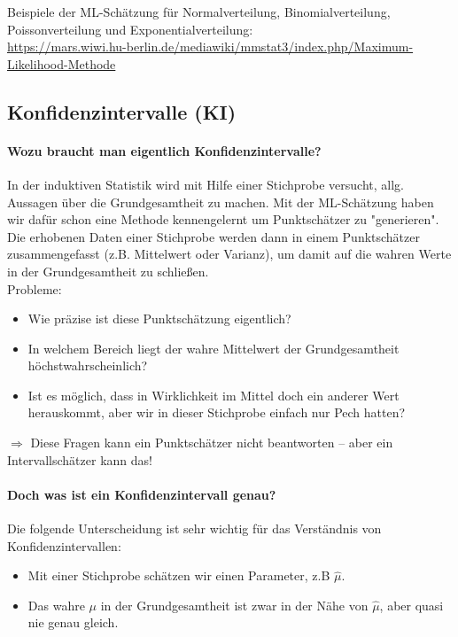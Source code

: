 \documentclass[a4paper]{article}
\newcommand\dangersign[1][2ex]{%
  \renewcommand\stacktype{L}%
  \scaleto{\stackon[1.3pt]{\color{red}$\triangle$}{\tiny !}}{#1}%
}
\begin{document}
\noindent Beispiele der ML-Schätzung für Normalverteilung, Binomialverteilung, Poissonverteilung und Exponentialverteilung:\\
\url{https://mars.wiwi.hu-berlin.de/mediawiki/mmstat3/index.php/Maximum-Likelihood-Methode}

\clearpage

\subsection{Konfidenzintervalle (KI)}\label{sec:KI}

\paragraph{Wozu braucht man eigentlich Konfidenzintervalle?} In der induktiven Statistik wird mit Hilfe einer Stichprobe versucht, allg. Aussagen über die Grundgesamtheit zu machen. Mit der ML-Schätzung haben wir dafür schon eine Methode kennengelernt um Punktschätzer zu "generieren". Die erhobenen Daten einer Stichprobe werden dann in einem Punktschätzer zusammengefasst (z.B. Mittelwert oder Varianz), um damit auf die wahren Werte in der Grundgesamtheit zu schließen.\\

\noindent \dangersign[3ex] Probleme:

\begin{itemize}
    \item Wie präzise ist diese Punktschätzung eigentlich?
    \item In welchem Bereich liegt der wahre Mittelwert der Grundgesamtheit höchstwahrscheinlich?
    \item Ist es möglich, dass in Wirklichkeit im Mittel doch ein anderer Wert herauskommt, aber wir in dieser Stichprobe einfach nur Pech hatten?
\end{itemize}

\noindent $\Rightarrow$ Diese Fragen kann ein Punktschätzer nicht beantworten – aber ein Intervallschätzer kann das!

\paragraph{Doch was ist ein Konfidenzintervall genau?} Die folgende Unterscheidung ist sehr wichtig für das Verständnis von Konfidenzintervallen:

\begin{itemize}
    \item Mit einer Stichprobe schätzen wir einen Parameter, z.B $\hat{\mu}$.
    \item Das wahre $\mu$ in der Grundgesamtheit ist zwar in der Nähe von $\hat{\mu}$, aber quasi nie genau gleich.
\end{itemize}
\end{document}
